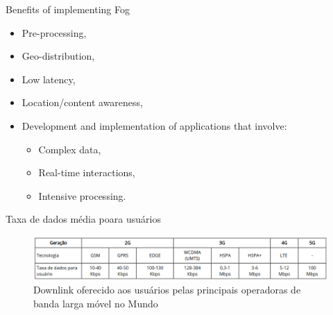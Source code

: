 \documentclass[10pt,aspectratio=169]{beamer} %
\begin{document}
\begin{frame}{Benefits of implementing Fog}
    \begin{itemize}
        \item Pre-processing,
        \item Geo-distribution,
        \item Low latency,
        \item Location/content awareness,
        \item Development and implementation of applications that involve:
        \begin{itemize}
            \item Complex data,
            \item Real-time interactions,
            \item Intensive processing.
        \end{itemize}
    \end{itemize}
\end{frame}

\begin{frame}{Taxa de dados média poara usuários}
\begin{figure}[!htb]
    \centering
    \includegraphics[scale=0.38]{LRCgraphics/taxadados_teleco.png}
    \caption{Downlink oferecido aos usuários pelas principais operadoras de banda larga móvel no Mundo}
\end{figure}
\end{frame}

\end{document}
